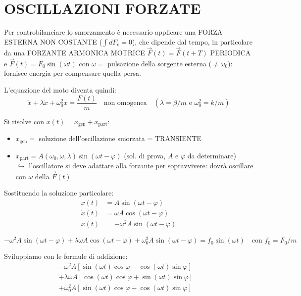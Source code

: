 \documentclass{article}
\begin{document}
\section*{OSCILLAZIONI FORZATE}
Per controbilanciare lo smorzamento è necessario applicare una FORZA ESTERNA NON COSTANTE ($\int dF_c = 0$), che dipende dal tempo, in particolare da una FORZANTE ARMONICA MOTRICE $\vec{F}(t) = \vec{F}(t+T)$ PERIODICA e $\vec{F}(t) = F_0 \sin(\omega t)$ con $\omega =$ pulsazione della sorgente esterna ($\neq \omega_0$): fornisce energia per compensare quella persa.

L'equazione del moto diventa quindi:
\begin{equation*}
\ddot{x} + \lambda \dot{x} + \omega_0^2 x = \frac{F(t)}{m} \quad \text{non omogenea} \quad (\lambda = \beta/m \text{ e } \omega_0^2 = k/m)
\end{equation*}

Si risolve con $x(t) = x_{\text{gen}} + x_{\text{part}}$:
\begin{itemize}
\item $x_{\text{gen}} =$ soluzione dell'oscillazione smorzata = TRANSIENTE
\item $x_{\text{part}} = A(\omega_0, \omega, \lambda) \sin(\omega t - \varphi)$ (sol. di prova, $A$ e $\varphi$ da determinare) \\
$\hookrightarrow$ l'oscillatore si deve adattare alla forzante per sopravvivere: dovrà oscillare con $\omega$ della $\vec{F}(t)$.
\end{itemize}

Sostituendo la soluzione particolare:
\begin{align*}
x(t) &= A \sin(\omega t - \varphi) \\
\dot{x}(t) &= \omega A \cos(\omega t - \varphi) \\
\ddot{x}(t) &= -\omega^2 A \sin(\omega t - \varphi)
\end{align*}

\begin{equation*}
-\omega^2 A \sin(\omega t - \varphi) + \lambda \omega A \cos(\omega t - \varphi) + \omega_0^2 A \sin(\omega t - \varphi) = f_0 \sin(\omega t) \quad \text{con } f_0 = F_0/m
\end{equation*}

Sviluppiamo con le formule di addizione:
\begin{align*}
-\omega^2 A [\sin(\omega t)\cos\varphi - \cos(\omega t)\sin\varphi] & \\
+\lambda \omega A [\cos(\omega t)\cos\varphi + \sin(\omega t)\sin\varphi] & \\
+\omega_0^2 A [\sin(\omega t)\cos\varphi - \cos(\omega t)\sin\varphi] &
\end{align*}
\end{document}
